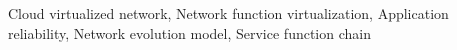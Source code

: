 \documentclass[journal]{IEEEtran}
\begin{document}
\begin{abstract}
    \end{abstract}

    \begin{IEEEkeywords}
        Cloud virtualized network, Network function virtualization, Application reliability, Network evolution model,
        Service function chain
    \end{IEEEkeywords}
\end{document}
